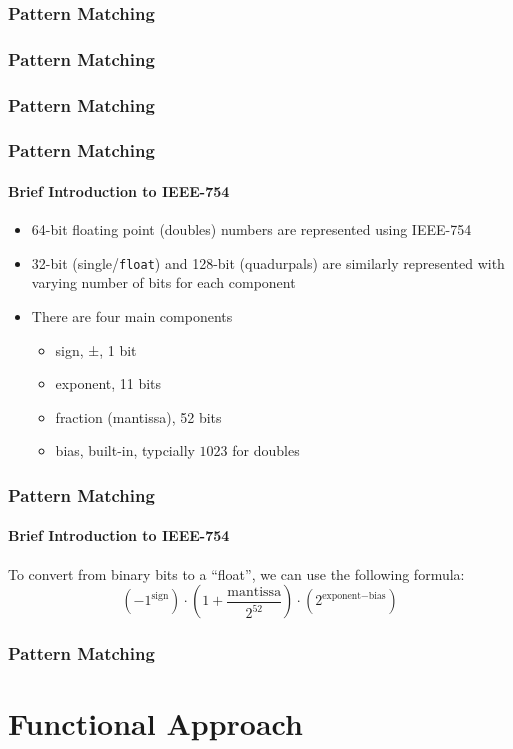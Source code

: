 \documentclass[english]{beamer}
\begin{document}
\begin{frame}[fragile]
\frametitle{Pattern Matching}

\end{frame}

\begin{frame}[fragile]
\frametitle{Pattern Matching}

\end{frame}

\begin{frame}[fragile]
\frametitle{Pattern Matching}

\end{frame}

\begin{frame}
\frametitle{Pattern Matching}
\framesubtitle{Brief Introduction to IEEE-754}
\begin{itemize}
\item{64-bit floating point (doubles) numbers are represented using IEEE-754}
\item{32-bit (single/\texttt{float}) and 128-bit (quadurpals) are similarly
represented with varying number of bits for each component}
\item{There are four main components}
\begin{itemize}
\item{sign, ±, 1 bit}
\item{exponent, 11 bits}
\item{fraction (mantissa), 52 bits}
\item{bias, built-in, typcially $1023$ for doubles}
\end{itemize}
\end{itemize}
\end{frame}

\begin{frame}
\frametitle{Pattern Matching}
\framesubtitle{Brief Introduction to IEEE-754}
To convert from binary bits to a ``float'', we can use the following formula:
$$
\left({}{-1}^{\text{sign}}\right){} \cdot{}
\left({}
1 + \frac{\text{mantissa}}{2^{52}}
\right){}
\cdot{} \left({}2^{\text{exponent} - \text{bias}}\right){}
$$
\end{frame}

\begin{frame}[fragile]
\frametitle{Pattern Matching}

\end{frame}

\section{Functional Approach}
\end{document}
